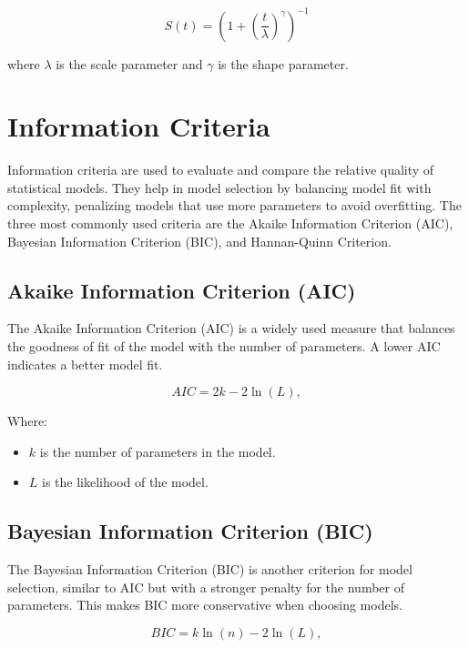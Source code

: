 \documentclass[doublespacing]{report} [12px]%
\begin{document}
\begin{equation}
    S(t) = \left(1 + \left(\frac{t}{\lambda}\right)^\gamma\right)^{-1}
\end{equation}

where \(\lambda\) is the scale parameter and \(\gamma\) is the shape parameter.


 
\section{Information Criteria}

Information criteria are used to evaluate and compare the relative quality of statistical models. They help in model selection by balancing model fit with complexity, penalizing models that use more parameters to avoid overfitting. The three most commonly used criteria are the Akaike Information Criterion (AIC), Bayesian Information Criterion (BIC), and Hannan-Quinn Criterion.

\subsection{Akaike Information Criterion (AIC)}

The Akaike Information Criterion (AIC) is a widely used measure that balances the goodness of fit of the model with the number of parameters. A lower AIC indicates a better model fit.

\begin{equation}
AIC = 2k - 2\ln(L),
\end{equation}

Where:
\begin{itemize}
    \item \(k\) is the number of parameters in the model.
    \item \(L\) is the likelihood of the model.
\end{itemize}

\subsection{Bayesian Information Criterion (BIC)}

The Bayesian Information Criterion (BIC) is another criterion for model selection, similar to AIC but with a stronger penalty for the number of parameters. This makes BIC more conservative when choosing models.

\begin{equation}
BIC = k\ln(n) - 2\ln(L),
\end{equation}
\end{document}
